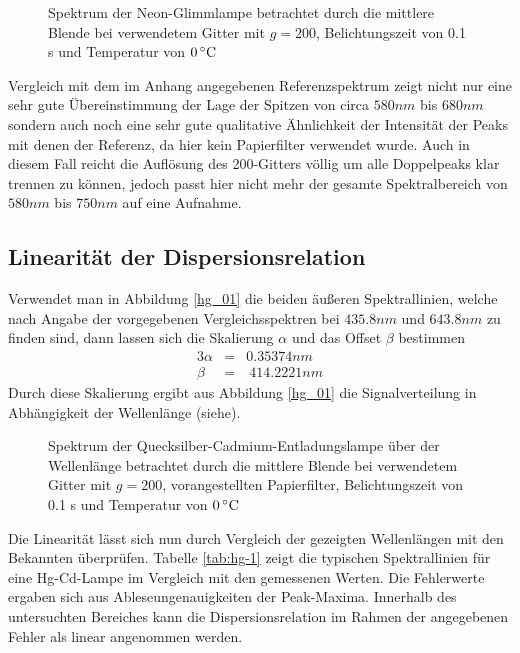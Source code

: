 		\begin{figure}
			\center
			
			\caption{Spektrum der Neon-Glimmlampe betrachtet durch die mittlere Blende bei verwendetem Gitter mit $g = 200$, Belichtungszeit von 0.1 s und Temperatur von $0\, \text{$^\circ$C}$}
			\label{ne_01}
		\end{figure}

		Vergleich mit dem im Anhang angegebenen Referenzspektrum zeigt nicht nur eine sehr gute Übereinstimmung der Lage der Spitzen von circa $580\unit{nm}$ bis $680\unit{nm}$ sondern auch noch eine sehr gute qualitative Ähnlichkeit der Intensität der Peaks mit denen der Referenz, da hier kein Papierfilter verwendet wurde.
		Auch in diesem Fall reicht die Auflösung des 200-Gitters völlig um alle Doppelpeaks klar trennen zu können, jedoch passt hier nicht mehr der gesamte Spektralbereich von $580\unit{nm}$ bis $750\unit{nm}$ auf eine Aufnahme.
	

	\subsection{Linearität der Dispersionsrelation} %
	\label{sub:linearit_t_der_dispersionsrelation}
	
		Verwendet man in Abbildung \ref{hg_01} die beiden äußeren Spektrallinien, welche nach Angabe der vorgegebenen Vergleichsspektren bei $435.8\unit{nm}$ und $643.8\unit{nm}$ zu finden sind, dann lassen sich die Skalierung $\alpha$ und das Offset $\beta$ bestimmen
		\begin{alignat*}{3}
			\alpha &= &0.35374\unit{nm} \\
			\beta &= &\ 414.2221\unit{nm}
		\end{alignat*}
		Durch diese Skalierung ergibt aus Abbildung \ref{hg_01} die Signalverteilung in Abhängigkeit der Wellenlänge (siehe).

		\begin{figure}
			\center
			
			\caption{Spektrum der Quecksilber-Cadmium-Entladungslampe über der Wellenlänge betrachtet durch die mittlere Blende bei verwendetem Gitter mit $g=200$, vorangestellten Papierfilter, Belichtungszeit von 0.1 s und Temperatur von $0\, \text{$^\circ$C}$}
			\label{hg-scale}
		\end{figure}

		Die Linearität lässt sich nun durch Vergleich der gezeigten Wellenlängen mit den Bekannten überprüfen.
		Tabelle \ref{tab:hg-1} zeigt die typischen Spektrallinien für eine Hg-Cd-Lampe im Vergleich mit den gemessenen Werten.
		Die Fehlerwerte ergaben sich aus Ableseungenauigkeiten der Peak-Maxima.
		Innerhalb des untersuchten Bereiches kann die Dispersionsrelation im Rahmen der angegebenen Fehler als linear angenommen werden.


